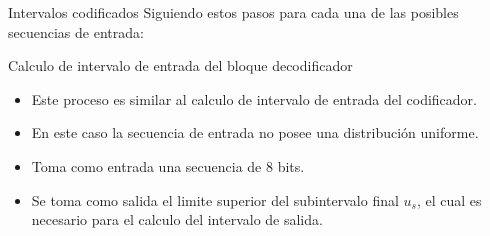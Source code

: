 \documentclass[xcolor=table]{beamer}
\begin{document}
\begin{frame}{Intervalos codificados}
 Siguiendo estos pasos para cada una de las posibles secuencias de entrada:
 
 \begin{table}[H]
\centering
{}
\end{table}


\end{frame}

\begin{frame}{Calculo de intervalo de entrada del bloque decodificador}
\begin{itemize}
    \item Este proceso  es similar al calculo de intervalo de entrada del codificador.
    \item En este caso la secuencia de entrada no posee una distribución uniforme.
    \item Toma como entrada una secuencia de 8 bits. 
    \item Se toma como salida el limite superior del subintervalo final $u_s$, el cual es necesario para el calculo del intervalo de salida.
\end{itemize}
\end{frame}
\end{document}
